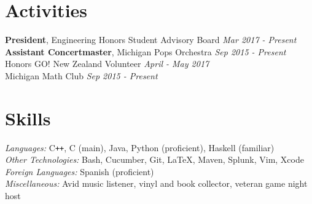 \documentclass[margin,line]{resume}
\begin{document}
\begin{resume}
	\sectionbreak
	\vspace{-2.5mm}
	\section{\mysidestyle Activities}
	\begin{flushright}
		\vspace{-7.5mm}
		\textbf{President}, Engineering Honors Student Advisory Board	\hfill  \textsl{Mar 2017 - Present} \\
		\textbf{Assistant Concertmaster}, Michigan Pops Orchestra  \hfill \textsl{Sep 2015 - Present}\\
		Honors GO! New Zealand Volunteer \hfill \textsl{April - May 2017} \\
		Michigan Math Club \hfill \textsl{Sep 2015 - Present}
	\end{flushright}
	\vspace{-1.5mm}
	    
	\sectionbreak
	\vspace{-2.5mm}
	\section{\mysidestyle Skills}
	\emph{Languages:} C\texttt{++}, C (main), Java, Python (proficient), Haskell (familiar) \\
	\emph{Other Technologies:} Bash, Cucumber, Git, \LaTeX, Maven, Splunk, Vim, Xcode \\
	\emph{Foreign Languages:} Spanish (proficient) \\
	\emph{Miscellaneous:}  Avid music listener, vinyl and book collector, veteran game night host
\end{resume}
\end{document}
